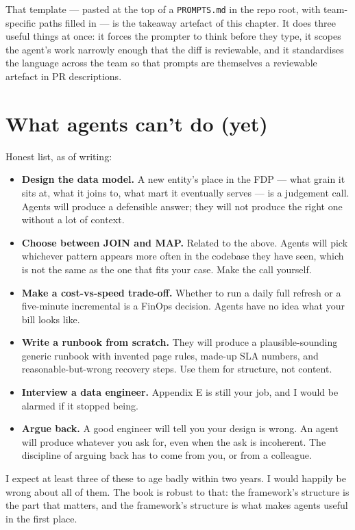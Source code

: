 \documentclass[
  11pt,
  british,
  oneside]{book}
\providecommand{\tightlist}{%
  \setlength{\itemsep}{0pt}\setlength{\parskip}{0pt}}
\begin{document}
That template --- pasted at the top of a \texttt{PROMPTS.md} in the repo
root, with team-specific paths filled in --- is the takeaway artefact of
this chapter. It does three useful things at once: it forces the
prompter to think before they type, it scopes the agent's work narrowly
enough that the diff is reviewable, and it standardises the language
across the team so that prompts are themselves a reviewable artefact in
PR descriptions.

\hypertarget{what-agents-cant-do-yet}{%
\section{What agents can't do (yet)}\label{what-agents-cant-do-yet}}

Honest list, as of writing:

\begin{itemize}
\tightlist
\item
  \textbf{Design the data model.} A new entity's place in the FDP ---
  what grain it sits at, what it joins to, what mart it eventually
  serves --- is a judgement call. Agents will produce a defensible
  answer; they will not produce the right one without a lot of context.
\item
  \textbf{Choose between JOIN and MAP.} Related to the above. Agents
  will pick whichever pattern appears more often in the codebase they
  have seen, which is not the same as the one that fits your case. Make
  the call yourself.
\item
  \textbf{Make a cost-vs-speed trade-off.} Whether to run a daily full
  refresh or a five-minute incremental is a FinOps decision. Agents have
  no idea what your bill looks like.
\item
  \textbf{Write a runbook from scratch.} They will produce a
  plausible-sounding generic runbook with invented page rules, made-up
  SLA numbers, and reasonable-but-wrong recovery steps. Use them for
  structure, not content.
\item
  \textbf{Interview a data engineer.} Appendix E is still your job, and
  I would be alarmed if it stopped being.
\item
  \textbf{Argue back.} A good engineer will tell you your design is
  wrong. An agent will produce whatever you ask for, even when the ask
  is incoherent. The discipline of arguing back has to come from you, or
  from a colleague.
\end{itemize}

I expect at least three of these to age badly within two years. I would
happily be wrong about all of them. The book is robust to that: the
framework's structure is the part that matters, and the framework's
structure is what makes agents useful in the first place.
\end{document}
